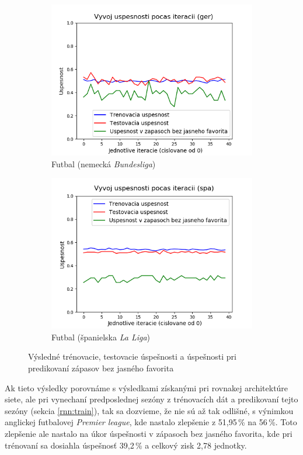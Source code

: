 \begin{figure}[h!]
\begin{subfigure}[b]{0.48\linewidth}
    \includegraphics[width=\linewidth]{../img/rnn_ger_res.png} 
    \caption{Futbal (nemecká \textit{Bundesliga})} 
  \end{subfigure}
  \hfill
  \begin{subfigure}[b]{0.48\linewidth}
    \includegraphics[width=\linewidth]{../img/rnn_spa_res3.png} 
    \caption{Futbal (španielska \textit{La Liga})} 
  \end{subfigure}
  \caption{Výsledné trénovacie, testovacie úspešnosti a úspešnosti pri predikovaní zápasov bez jasného favorita}
   \label{fig10} 
\end{figure}
Ak tieto výsledky porovnáme s výsledkami získanými pri rovnakej architektúre siete, ale pri vynechaní predposlednej sezóny z trénovacích dát a pre\-dikovaní tejto sezóny (sekcia \ref{rnn:train}), tak sa dozvieme, že nie sú až tak odlišné, s výnimkou anglickej futbalovej \textit{Premier league}, kde nastalo zlepšenie z 51,95\,\% na 56\,\%.
Toto zlepšenie ale nastalo na úkor úspešnosti v zápasoch bez jasného favorita, kde pri trénovaní sa dosiahla úspešnosť 39,2\,\% a celkový zisk 2,78 jednotky.

